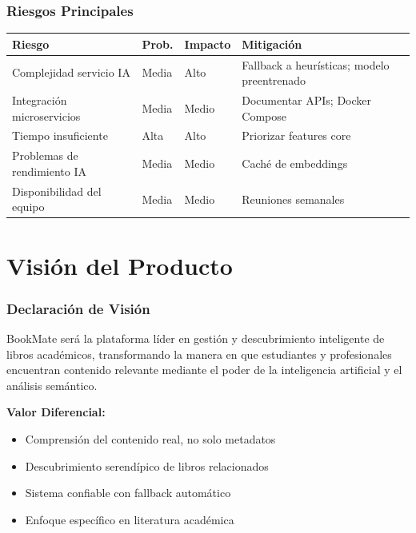 \documentclass[aspectratio=169]{beamer}
\begin{document}
\begin{frame}
\frametitle{Riesgos Principales}

\begin{table}
\centering
\tiny
\begin{tabular}{p{3.5cm}p{1.5cm}p{1.5cm}p{4.5cm}}
\toprule
\textbf{Riesgo} & \textbf{Prob.} & \textbf{Impacto} & \textbf{Mitigación} \\
\midrule
Complejidad servicio IA & Media & Alto & Fallback a heurísticas; modelo preentrenado \\
Integración microservicios & Media & Medio & Documentar APIs; Docker Compose \\
Tiempo insuficiente & Alta & Alto & Priorizar features core \\
Problemas de rendimiento IA & Media & Medio & Caché de embeddings \\
Disponibilidad del equipo & Media & Medio & Reuniones semanales \\
\bottomrule
\end{tabular}
\end{table}

\end{frame}

\section{Visión del Producto}

\begin{frame}
\frametitle{Declaración de Visión}

\begin{tcolorbox}[colback=blue!5, colframe=blue!50, title=Visión de BookMate]
\large
BookMate será la plataforma líder en gestión y descubrimiento inteligente de libros académicos, transformando la manera en que estudiantes y profesionales encuentran contenido relevante mediante el poder de la inteligencia artificial y el análisis semántico.
\end{tcolorbox}

\vspace{0.5cm}

\textbf{Valor Diferencial:}
\begin{itemize}
\item Comprensión del contenido real, no solo metadatos
\item Descubrimiento serendípico de libros relacionados
\item Sistema confiable con fallback automático
\item Enfoque específico en literatura académica
\end{itemize}

\end{frame}
\end{document}
